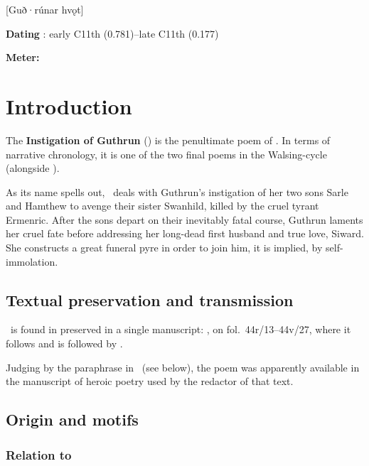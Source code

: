 [Guð·rúnar hvǫt]

\begin{flushright}%
\textbf{Dating} \parencite{Sapp2022}: early C11th (0.781)--late C11th (0.177)

\textbf{Meter:} \Fornyrdislag
\end{flushright}%

\section{Introduction}

The \textbf{Instigation of Guthrun} (\Gudrunarhvot) is the penultimate poem of \Regius.  In terms of narrative chronology, it is one of the two final poems in the Walsing-cycle (alongside ).

As its name spells out, \Gudrunarhvot\ deals with Guthrun’s instigation of her two sons Sarle and Hamthew to avenge their sister Swanhild, killed by the cruel tyrant Ermenric.  After the sons depart on their inevitably fatal course, Guthrun laments her cruel fate before addressing her long-dead first husband and true love, Siward.  She constructs a great funeral pyre in order to join him, it is implied, by self-immolation.

\subsection{Textual preservation and transmission}

\Gudrunarhvot\ is found in preserved in a single manuscript: \Regius, on fol.~44r/13--44v/27, where it follows  and is followed by .

Judging by the paraphrase in \VolsungaSaga\ (see below), the poem was apparently available in the manuscript of heroic poetry used by the redactor of that text.

\subsection{Origin and motifs}

\subsubsection{Relation to }

